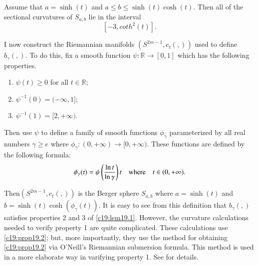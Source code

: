 \begin{prop}\label{c19:prop19.2}
Assume that $a=\sinh(t)$ and $a\leq b\leq \sinh(t)\cosh(t)$. Then all
of the sectional curvatures of $S_{a,b}$ lie in the interval
$$
[-3,coth^{2}(t)].
$$ 
\end{prop}

I now construct the Riemannian manifolds $(S^{2m-1},c_{t}(,))$ used to
define $b_{\gamma}(,)$. To do this, fix a smooth function
$\psi:\mathbb{R}\to [0,1]$ which has the following properties.
\begin{enumerate}
\item $\psi(t)\geq 0$ for all $t\in \mathbb{R}$;

\item $\psi^{-1}(0)=(-\infty,1]$;

\item $\psi^{-1}(1)=[2,+\infty)$.
\end{enumerate}

Then use $\psi$ to define a family of smooth functions $\phi_{\gamma}$
parameterized by all real numbers $\gamma\geq e$ where
$\phi_{\gamma}:(0,+\infty)\to [0,+\infty)$. These functions are
  defined by the following formula:
$$
\phi_{\gamma}(t)=\psi\left(\frac{\text{ln\,}t}{\text{ln\,}\gamma}\right)t\quad\text{where}\quad
t\in (0,+\infty).
$$

Then\pageoriginale $(S^{2m-1},c_{t}(,))$ is the Berger sphere
$S_{a,b}$ where $a=\sinh(t)$ and
$b=\sinh(t)\cosh(\phi_{\gamma}(t))$. It is easy to see from this
definition that $b_{\gamma}(,)$ satisfies properties 2 and 3 of
\ref{c19:lem19.1}. However, the curvature calculations needed to
verify property 1 are quite complicated. These calculations use
\ref{c19:prop19.2}; but, more importantly, they use the method for
obtaining \ref{c19:prop19.2} via O'Neill's Riemannian submersion
formula. This method is used in a more elaborate way in varifying
property 1. See \cite[\S 2]{46} for details.
